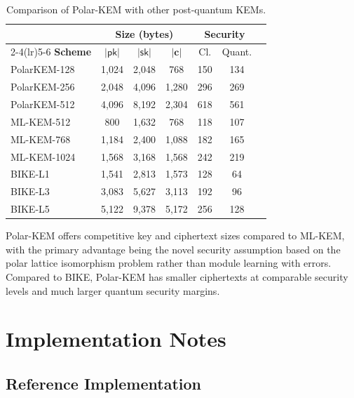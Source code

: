 \documentclass[11pt,a4paper]{article}
\newcommand{\polarKem}{\textsf{Polar-KEM}\xspace}
\newcommand{\MLKEM}{\textsf{ML-KEM}\xspace}
\newcommand{\BIKE}{\textsf{BIKE}\xspace}
\newcommand{\pk}{\mathsf{pk}}
\newcommand{\sk}{\mathsf{sk}}
\begin{document}
\begin{table}[H]
\centering
\caption{Comparison of \polarKem with other post-quantum KEMs.}
\label{tab:comparison}
\begin{tabular}{@{}lcccccc@{}}
\toprule
 & \multicolumn{3}{c}{\textbf{Size (bytes)}} & \multicolumn{2}{c}{\textbf{Security}} & \\
\cmidrule(lr){2-4}\cmidrule(lr){5-6}
\textbf{Scheme} & $|\pk|$ & $|\sk|$ & $|\mathbf{c}|$ & Cl. & Quant. & \\
\midrule
\textsf{PolarKEM-128} & 1,024 & 2,048 & 768 & 150 & 134 \\
\textsf{PolarKEM-256} & 2,048 & 4,096 & 1,280 & 296 & 269 \\
\textsf{PolarKEM-512} & 4,096 & 8,192 & 2,304 & 618 & 561 \\
\midrule
\MLKEM-512 & 800 & 1,632 & 768 & 118 & 107 \\
\MLKEM-768 & 1,184 & 2,400 & 1,088 & 182 & 165 \\
\MLKEM-1024 & 1,568 & 3,168 & 1,568 & 242 & 219 \\
\midrule
\BIKE-L1 & 1,541 & 2,813 & 1,573 & 128 & 64 \\
\BIKE-L3 & 3,083 & 5,627 & 3,113 & 192 & 96 \\
\BIKE-L5 & 5,122 & 9,378 & 5,172 & 256 & 128 \\
\bottomrule
\end{tabular}
\end{table}

\polarKem offers competitive key and ciphertext sizes compared to \MLKEM, with the primary advantage being the novel security assumption based on the polar lattice isomorphism problem rather than module learning with errors. Compared to \BIKE, \polarKem has smaller ciphertexts at comparable security levels and much larger quantum security margins.


\section{Implementation Notes}\label{sec:implementation}

\subsection{Reference Implementation}\label{sec:reference-impl}
\end{document}
